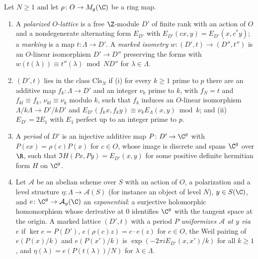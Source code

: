 \begin{definition}\label{pf:ks2:def:periods}
Let $N\ge1$ and let $\rho\colon O\to M_g(\C)$ be a ring map.
\begin{enumerate}
\item A \emph{polarized $O$-lattice} is a free $\Z$-module $D'$ of finite rank with an action of $O$
  and a nondegenerate alternating form $E_{D'}$ with $E_{D'}(cx,y)=E_{D'}(x,c^*y)$; a \emph{marking}
  is a map $t\colon\Lambda\to D'$. A \emph{marked isometry} $w\colon(D',t)\to(D'',t'')$ is an
  $O$-linear isomorphism $D'\to D''$ preserving the forms with $w(t(\lambda))\equiv t''(\lambda)\bmod
  ND''$ for $\lambda\in\Lambda$.
\item $(D',t)$ lies in the class $\mathrm{Cls}_N$ if (i) for every $k\ge1$ prime to $p$ there are an
  additive map $f_k\colon\Lambda\to D'$ and an integer $\nu_k$ prime to $k$, with $f_N=t$ and
  $f_{kl}\equiv f_k$, $\nu_{kl}\equiv\nu_k$ modulo $k$, such that $f_k$ induces an $O$-linear
  isomorphism $\Lambda/k\Lambda\to D'/kD'$ and $E_{D'}(f_kx,f_ky)\equiv\nu_kE_\Lambda(x,y)\bmod k$; and
  (ii) $E_{D'}=2E_1$ with $E_1$ perfect up to an integer prime to $p$.
\item A \emph{period} of $D'$ is an injective additive map $P\colon D'\to\C^g$ with
  $P(cx)=\rho(c)P(x)$ for $c\in O$, whose image is discrete and spans $\C^g$ over $\R$, such that
  $\Im H(Px,Py)=E_{D'}(x,y)$ for some positive definite hermitian form $H$ on $\C^g$.
\item Let $\mathcal A$ be an abelian scheme over $S$ with an action of $O$, a polarization and a level
  structure $\eta\colon\Lambda\to\mathcal A(S)$ (for instance an object of level $N$), $y\in
  S(\C)$, and $e\colon\C^g\to\mathcal A_y(\C)$ an \emph{exponential}: a surjective holomorphic
  homomorphism whose derivative at $0$ identifies $\C^g$ with the tangent space at the origin. A
  marked lattice $(D',t)$ with a period $P$ \emph{uniformizes $\mathcal A$ at $y$ via $e$} if $\ker
  e=P(D')$, $e(\rho(c)z)=c\cdot e(z)$ for $c\in O$, the Weil pairing of $e(P(x)/k)$ and $e(P(x')/k)$
  is $\exp(-2\pi iE_{D'}(x,x')/k)$ for all $k\ge1$, and $\eta(\lambda)=e(P(t(\lambda))/N)$ for
  $\lambda\in\Lambda$.
\end{enumerate}
\end{definition}

